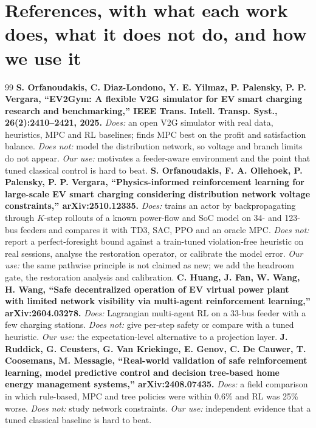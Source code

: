 \documentclass[11pt]{article}
\begin{document}
\section*{References, with what each work does, what it does not do, and how we use it}
\small
\begin{thebibliography}{99}\setlength{\itemsep}{4pt}
\textbf{S. Orfanoudakis, C. Diaz-Londono, Y. E. Yilmaz, P. Palensky, P. P. Vergara, ``EV2Gym: A flexible V2G simulator for EV smart charging research and benchmarking,'' IEEE Trans. Intell. Transp. Syst., 26(2):2410--2421, 2025.} \emph{Does:} an open V2G simulator with real data, heuristics, MPC and RL baselines; finds MPC best on the profit and satisfaction balance. \emph{Does not:} model the distribution network, so voltage and branch limits do not appear. \emph{Our use:} motivates a feeder-aware environment and the point that tuned classical control is hard to beat.
\textbf{S. Orfanoudakis, F. A. Oliehoek, P. Palensky, P. P. Vergara, ``Physics-informed reinforcement learning for large-scale EV smart charging considering distribution network voltage constraints,'' arXiv:2510.12335.} \emph{Does:} trains an actor by backpropagating through $K$-step rollouts of a known power-flow and SoC model on 34- and 123-bus feeders and compares it with TD3, SAC, PPO and an oracle MPC. \emph{Does not:} report a perfect-foresight bound against a train-tuned violation-free heuristic on real sessions, analyse the restoration operator, or calibrate the model error. \emph{Our use:} the same pathwise principle is not claimed as new; we add the headroom gate, the restoration analysis and calibration.
\textbf{C. Huang, J. Fan, W. Wang, H. Wang, ``Safe decentralized operation of EV virtual power plant with limited network visibility via multi-agent reinforcement learning,'' arXiv:2604.03278.} \emph{Does:} Lagrangian multi-agent RL on a 33-bus feeder with a few charging stations. \emph{Does not:} give per-step safety or compare with a tuned heuristic. \emph{Our use:} the expectation-level alternative to a projection layer.
\textbf{J. Ruddick, G. Ceusters, G. Van Kriekinge, E. Genov, C. De Cauwer, T. Coosemans, M. Messagie, ``Real-world validation of safe reinforcement learning, model predictive control and decision tree-based home energy management systems,'' arXiv:2408.07435.} \emph{Does:} a field comparison in which rule-based, MPC and tree policies were within 0.6\% and RL was 25\% worse. \emph{Does not:} study network constraints. \emph{Our use:} independent evidence that a tuned classical baseline is hard to beat.

\end{thebibliography}
\end{document}
